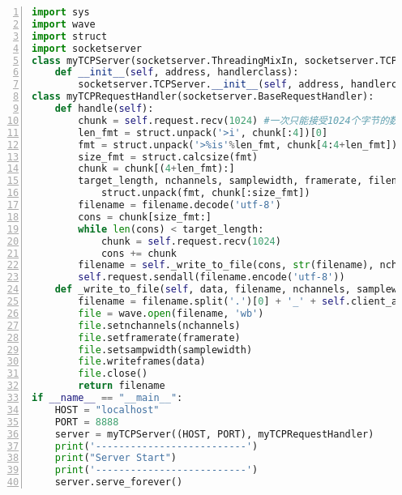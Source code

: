 \begin{lstlisting}[language = python, caption={音频传输的server端代码}, label={lst:sendsave-wave-server}, numbers=left, 
       numberstyle=\tiny,keywordstyle=\color{blue!70},
       commentstyle=\color{red!50!green!50!blue!50},frame=shadowbox,
       rulesepcolor=\color{red!20!green!20!blue!20},basicstyle=\ttfamily]
import sys
import wave
import struct
import socketserver
class myTCPServer(socketserver.ThreadingMixIn, socketserver.TCPServer):
    def __init__(self, address, handlerclass):
        socketserver.TCPServer.__init__(self, address, handlerclass)
class myTCPRequestHandler(socketserver.BaseRequestHandler):
    def handle(self):
        chunk = self.request.recv(1024) #一次只能接受1024个字节的数据，其他的会继续传过来
        len_fmt = struct.unpack('>i', chunk[:4])[0] 
        fmt = struct.unpack('>%is'%len_fmt, chunk[4:4+len_fmt])[0].decode('utf-8') 
        size_fmt = struct.calcsize(fmt)
        chunk = chunk[(4+len_fmt):]
        target_length, nchannels, samplewidth, framerate, filename = \
            struct.unpack(fmt, chunk[:size_fmt])
        filename = filename.decode('utf-8')
        cons = chunk[size_fmt:]
        while len(cons) < target_length:
            chunk = self.request.recv(1024)
            cons += chunk
        filename = self._write_to_file(cons, str(filename), nchannels, samplewidth, framerate)
        self.request.sendall(filename.encode('utf-8'))
    def _write_to_file(self, data, filename, nchannels, samplewidth, framerate):
        filename = filename.split('.')[0] + '_' + self.client_address[0] + '.wav'
        file = wave.open(filename, 'wb')
        file.setnchannels(nchannels)
        file.setframerate(framerate)
        file.setsampwidth(samplewidth)
        file.writeframes(data)
        file.close()
        return filename
if __name__ == "__main__":
    HOST = "localhost"
    PORT = 8888
    server = myTCPServer((HOST, PORT), myTCPRequestHandler)
    print('--------------------------')
    print("Server Start")
    print('--------------------------')
    server.serve_forever()
\end{lstlisting}